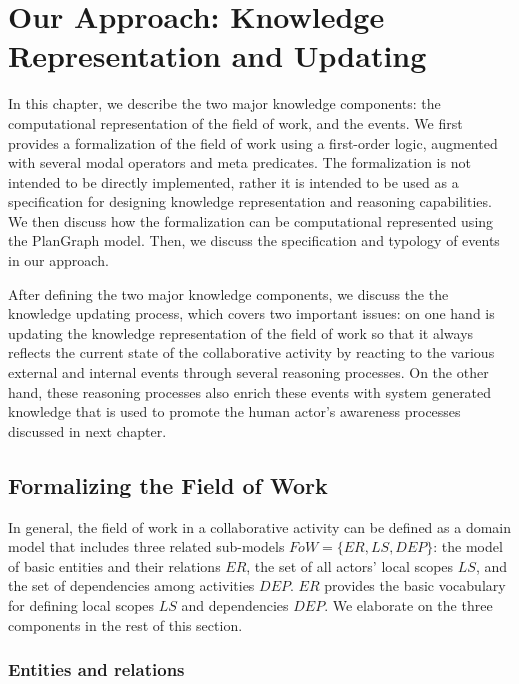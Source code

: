 \graphicspath{{Figures/}}

\chapter{Our Approach: Knowledge Representation and Updating} %
\label{cha:knowledge_reprsentation_and_updating}
In this chapter, we describe the two major knowledge components: the computational representation of the field of work, and the events. We first provides a formalization of the field of work using a first-order logic, augmented with several modal operators and meta predicates. The formalization is not intended to be directly implemented, rather it is intended to be used as a specification for designing knowledge representation and reasoning capabilities. We then discuss how the formalization can be computational represented using the PlanGraph model. Then, we discuss the specification and typology of events in our approach.

After defining the two major knowledge components, we discuss the the knowledge updating process, which covers two important issues: on one hand is updating the knowledge representation of the field of work so that it always reflects the current state of the collaborative activity by reacting to the various external and internal events through several reasoning processes. On the other hand, these reasoning processes also enrich these events with system generated knowledge that is used to promote the human actor's awareness processes discussed in next chapter.

\section{Formalizing the Field of Work} %
\label{sec:formalizaing_the_field_of_work}
In general, the field of work in a collaborative activity can be defined as a domain model that includes three related sub-models $FoW=\{ER, LS, DEP\}$: the model of basic entities and their relations $ER$, the set of all actors' local scopes $LS$, and the set of dependencies among activities $DEP$. $ER$ provides the basic vocabulary for defining local scopes $LS$ and dependencies $DEP$. We elaborate on the three components in the rest of this section. 

\subsection{Entities and relations} %
\label{sub:entities_relations}
